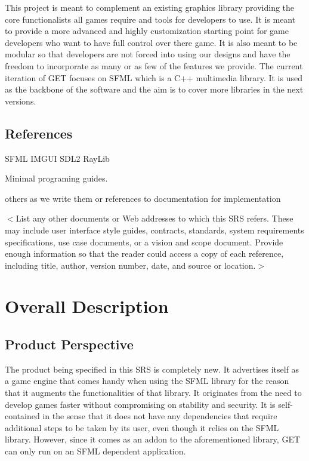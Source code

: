 \documentclass{scrreprt}
\begin{document}
This project is meant to complement an existing graphics library providing the core functionalists all games require and tools for developers to use.  It is meant to provide a more advanced and highly customization starting point for game developers who want to have full control over there game.  It is also meant to be modular so that developers are not forced into using our designs and have the freedom to incorporate as many or as few of the features we provide. The current iteration of GET focuses on SFML which is a C++ multimedia library. It is used as the backbone of the software and the aim is to cover more libraries in the next versions.


\section{References}

SFML 
IMGUI
SDL2
RayLib

Minimal programing guides. 

others as we write them or references to documentation for implementation

$<$List any other documents or Web addresses to which this SRS refers. These may 
include user interface style guides, contracts, standards, system requirements 
specifications, use case documents, or a vision and scope document. Provide 
enough information so that the reader could access a copy of each reference, 
including title, author, version number, date, and source or location.$>$


\chapter{Overall Description}

\section{Product Perspective}

The product being specified in this SRS is completely new. It advertises itself as a game engine that comes handy when using the SFML library for the reason that it augments the functionalities of that library. It originates from the need to develop games faster without compromising on stability and security. It is self-contained in the sense that it does not have any dependencies that require additional steps to be taken by its user, even though it relies on the SFML library. However, since it comes as an addon to the aforementioned library, GET can only run on an SFML dependent application.
\end{document}
